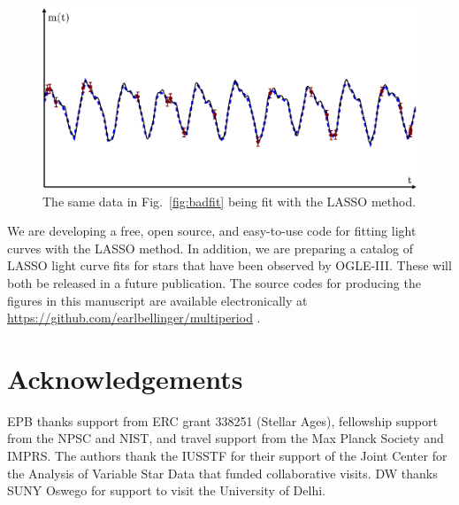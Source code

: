 \documentclass[11pt,twoside]{book}
\begin{document}
\begin{figure}[!t]
    \centering
    \includegraphics[width=\textwidth]{bellinger-fig2.eps}
    \caption{The same data in Fig.~\ref{fig:badfit} being fit with the LASSO method.}%
    \label{fig:goodfit} 
\end{figure}

We are developing a free, open source, and easy-to-use code for fitting light curves with the LASSO method. In addition, we are preparing a catalog of LASSO light curve fits for stars that have been observed by OGLE-III. These will both be released in a future publication. The source codes for producing the figures in this manuscript are available electronically at \url{https://github.com/earlbellinger/multiperiod} \citep{bellinger2015lasso}.

\section*{Acknowledgements}
EPB thanks support from ERC grant 338251 (Stellar Ages), fellowship support from the NPSC and NIST, and travel support from the Max Planck Society and IMPRS. The authors thank the IUSSTF for their support of the Joint Center for the Analysis of Variable Star Data that funded collaborative visits. DW thanks SUNY Oswego for support to visit the University of Delhi. 
\end{document}
